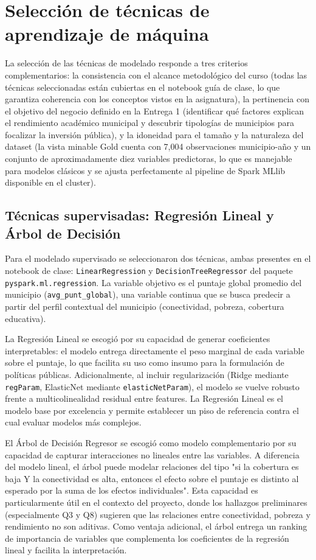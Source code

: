 \section{Selección de técnicas de aprendizaje de máquina}
La selección de las técnicas de modelado responde a tres criterios complementarios: la consistencia con el alcance metodológico del curso (todas las técnicas seleccionadas están cubiertas en el notebook guía de clase, lo que garantiza coherencia con los conceptos vistos en la asignatura), la pertinencia con el objetivo del negocio definido en la Entrega 1 (identificar qué factores explican el rendimiento académico municipal y descubrir tipologías de municipios para focalizar la inversión pública), y la idoneidad para el tamaño y la naturaleza del dataset (la vista minable Gold cuenta con 7,004 observaciones municipio-año y un conjunto de aproximadamente diez variables predictoras, lo que es manejable para modelos clásicos y se ajusta perfectamente al pipeline de Spark MLlib disponible en el cluster).

\subsection{Técnicas supervisadas: Regresión Lineal y Árbol de Decisión}
Para el modelado supervisado se seleccionaron dos técnicas, ambas presentes en el notebook de clase: \texttt{LinearRegression} y \texttt{DecisionTreeRegressor} del paquete \texttt{pyspark.ml.regression}. La variable objetivo es el puntaje global promedio del municipio (\texttt{avg\_punt\_global}), una variable continua que se busca predecir a partir del perfil contextual del municipio (conectividad, pobreza, cobertura educativa).

La Regresión Lineal se escogió por su capacidad de generar coeficientes interpretables: el modelo entrega directamente el peso marginal de cada variable sobre el puntaje, lo que facilita su uso como insumo para la formulación de políticas públicas. Adicionalmente, al incluir regularización (Ridge mediante \texttt{regParam}, ElasticNet mediante \texttt{elasticNetParam}), el modelo se vuelve robusto frente a multicolinealidad residual entre features. La Regresión Lineal es el modelo base por excelencia y permite establecer un piso de referencia contra el cual evaluar modelos más complejos.

El Árbol de Decisión Regresor se escogió como modelo complementario por su capacidad de capturar interacciones no lineales entre las variables. A diferencia del modelo lineal, el árbol puede modelar relaciones del tipo "si la cobertura es baja Y la conectividad es alta, entonces el efecto sobre el puntaje es distinto al esperado por la suma de los efectos individuales". Esta capacidad es particularmente útil en el contexto del proyecto, donde los hallazgos preliminares (especialmente Q3 y Q8) sugieren que las relaciones entre conectividad, pobreza y rendimiento no son aditivas. Como ventaja adicional, el árbol entrega un ranking de importancia de variables que complementa los coeficientes de la regresión lineal y facilita la interpretación.

